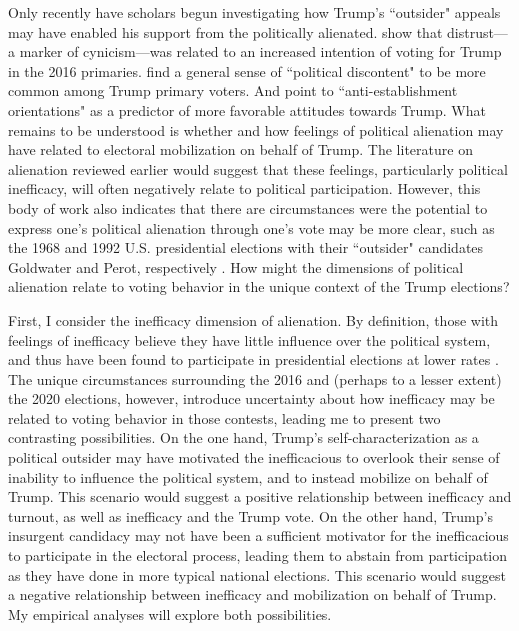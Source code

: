 \documentclass[12pt]{article}
\begin{document}
Only recently have scholars begun investigating how Trump's ``outsider" appeals may have enabled his support from the politically alienated. \textcite{dyck2018primary} show that distrust---a marker of cynicism---was related to an increased intention of voting for Trump in the 2016 primaries. \textcite{santucci2022structure} find a general sense of ``political discontent" to be more common among Trump primary voters. And \textcite{uscinski2021american} point to ``anti-establishment orientations" as a predictor of more favorable attitudes towards Trump. What remains to be understood is whether and how feelings of political alienation may have related to electoral mobilization on behalf of Trump. The literature on alienation reviewed earlier would suggest that these feelings, particularly political inefficacy, will often negatively relate to political participation. However, this body of work also indicates that there are circumstances were the potential to express one's political alienation through one's vote may be more clear, such as the 1968 and 1992 U.S. presidential elections with their ``outsider" candidates Goldwater and Perot, respectively \parencite{atkeson1996citizens,southwell1998electoral}. How might the dimensions of political alienation relate to voting behavior in the unique context of the Trump elections?

First, I consider the inefficacy dimension of alienation. By definition, those with feelings of inefficacy believe they have little influence over the political system, and thus have been found to participate in presidential elections at lower rates \parencite[e.g.,][]{southwell1998electoral,southwell2003politics}. The unique circumstances surrounding the 2016 and (perhaps to a lesser extent) the 2020 elections, however, introduce uncertainty about how inefficacy may be related to voting behavior in those contests, leading me to present two contrasting possibilities. On the one hand, Trump's self-characterization as a political outsider may have motivated the inefficacious to overlook their sense of inability to influence the political system, and to instead mobilize on behalf of Trump. This scenario would suggest a positive relationship between inefficacy and turnout, as well as inefficacy and the Trump vote. On the other hand, Trump's insurgent candidacy may not have been a sufficient motivator for the inefficacious to participate in the electoral process, leading them to abstain from participation as they have done in more typical national elections. This scenario would suggest a negative relationship between inefficacy and mobilization on behalf of Trump. My empirical analyses will explore both possibilities.
\end{document}
